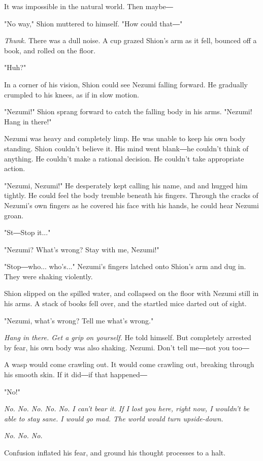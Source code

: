 It was impossible in the natural world. Then maybe―

"No way," Shion muttered to himself. "How could that―"

\emph{Thunk.} There was a dull noise. A cup grazed Shion's arm as it fell,
bounced off a book, and rolled on the floor.

"Huh?"

In a corner of his vision, Shion could see Nezumi falling forward. He
gradually crumpled to his knees, as if in slow motion.

"Nezumi!" Shion sprang forward to catch the falling body in his arms.
"Nezumi! Hang in there!"

Nezumi was heavy and completely limp. He was unable to keep his own body
standing. Shion couldn't believe it. His mind went blank―he couldn't
think of anything. He couldn't make a rational decision. He couldn't
take appropriate action.

"Nezumi, Nezumi!" He desperately kept calling his name, and and hugged
him tightly. He could feel the body tremble beneath his fingers. Through
the cracks of Nezumi's own fingers as he covered his face with his
hands, he could hear Nezumi groan.

"St―Stop it..."

"Nezumi? What's wrong? Stay with me, Nezumi!"

"Stop―who... who's..." Nezumi's fingers latched onto Shion's arm and dug
in. They were shaking violently.

Shion slipped on the spilled water, and collapsed on the floor with
Nezumi still in his arms. A stack of books fell over, and the startled
mice darted out of sight.

"Nezumi, what's wrong? Tell me what's wrong."

\emph{Hang in there. Get a grip on yourself.} He told himself. But completely
arrested by fear, his own body was also shaking. Nezumi. Don't tell
me―not you too―

A wasp would come crawling out. It would come crawling out, breaking
through his smooth skin. If it did―if that happened―

"No!"

\emph{No. No. No. No. No. I can't bear it. If I lost you here, right now, I
wouldn't be able to stay sane. I would go mad. The world would turn
upside-down.}

\emph{No. No. No.}

Confusion inflated his fear, and ground his thought processes to a halt.

